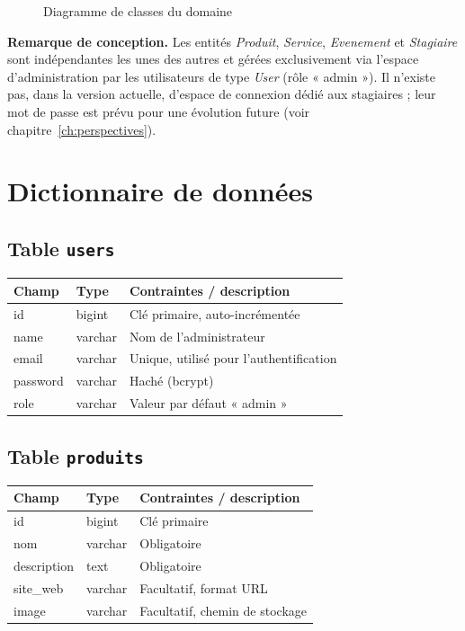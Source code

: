 \documentclass[11pt,a4paper]{report}
\begin{document}
\begin{figure}[h!]
{\begin{tikzpicture}
\end{tikzpicture}%
}
\caption{Diagramme de classes du domaine}
\label{fig:mcd}
\end{figure}

\begin{infobox}
\textbf{Remarque de conception.} Les entités \textit{Produit},
\textit{Service}, \textit{Evenement} et \textit{Stagiaire} sont
indépendantes les unes des autres et gérées exclusivement via
l'espace d'administration par les utilisateurs de type \textit{User}
(rôle « admin »). Il n'existe pas, dans la version actuelle, d'espace de
connexion dédié aux stagiaires ; leur mot de passe est prévu pour une
évolution future (voir chapitre~\ref{ch:perspectives}).
\end{infobox}

\section{Dictionnaire de données}

\subsection*{Table \texttt{users}}
\begin{center}
\renewcommand{\arraystretch}{1.2}
\begin{tabular}{L{2.6cm} L{2.6cm} L{7.8cm}}
\toprule
{}
\textbf{Champ} & \textbf{Type} & \textbf{Contraintes / description} \\
\midrule
id & bigint & Clé primaire, auto-incrémentée \\
name & varchar & Nom de l'administrateur \\
email & varchar & Unique, utilisé pour l'authentification \\
password & varchar & Haché (bcrypt) \\
role & varchar & Valeur par défaut « admin » \\
\bottomrule
\end{tabular}
\end{center}

\subsection*{Table \texttt{produits}}
\begin{center}
\renewcommand{\arraystretch}{1.2}
\begin{tabular}{L{2.6cm} L{2.6cm} L{7.8cm}}
\toprule
{}
\textbf{Champ} & \textbf{Type} & \textbf{Contraintes / description} \\
\midrule
id & bigint & Clé primaire \\
nom & varchar & Obligatoire \\
description & text & Obligatoire \\
site\_web & varchar & Facultatif, format URL \\
image & varchar & Facultatif, chemin de stockage \\
\bottomrule
\end{tabular}
\end{center}
\end{document}
